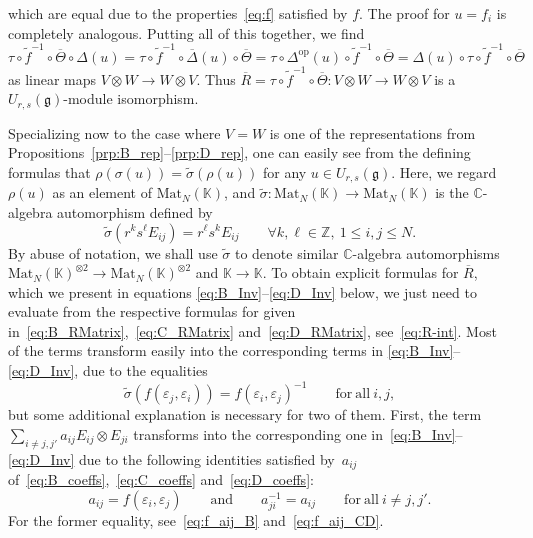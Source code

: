 \documentclass[pdftex]{sigma}
\numberwithin{equation}{section}
\DeclareMathOperator{\op}{op}
\newcommand{\fg}{\mathfrak{g}}
\newcommand{\BZ}{\mathbb{Z}}
\newcommand{\BC}{\mathbb{C}}
\newcommand{\uu}{U_{r,s}(\fg)}
\begin{document}
which are equal due to the properties~\eqref{eq:f} satisfied by $f$. The proof for $u = f_{i}$ is completely analogous. Putting all of this together, we find
\begin{displaymath}
 \tau \circ \widetilde{f}^{-1} \circ \overline{\Theta} \circ \Delta(u) =
 \tau \circ \widetilde{f}^{-1} \circ \overline{\Delta}(u)\circ \overline{\Theta} =
 \tau \circ \Delta^{\op}(u) \circ \widetilde{f}^{-1}\circ \overline{\Theta} =
 \Delta(u) \circ \tau \circ \widetilde{f}^{-1} \circ \overline{\Theta}
\end{displaymath}
as linear maps $V \otimes W \to W \otimes V$. Thus $\overline{R} = \tau \circ \widetilde{f}^{-1}\circ \overline{\Theta}\colon V \otimes W \to W \otimes V$ is a $\uu$-module isomorphism.

Specializing now to the case where $V = W$ is one of the representations from Propositions~\ref{prp:B_rep}--\ref{prp:D_rep}, one can easily see from the defining formulas that $\rho(\sigma(u)) = \widetilde{\sigma}(\rho(u))$ for any $u \in \uu$. Here, we regard $\rho(u)$ as an element of $\mathrm{Mat}_{N}(\mathbb{K})$, and $\widetilde{\sigma}\colon \mathrm{Mat}_{N}(\mathbb{K}) \to \mathrm{Mat}_{N}(\mathbb{K})$ is the $\mathbb{C}$-algebra automorphism defined by
\begin{displaymath}
 \widetilde{\sigma}(r^{k}s^{\ell}E_{ij}) = r^{\ell}s^{k}E_{ij} \qquad \forall k,\ell\in \BZ,\ 1\leq i,j\leq N.
\end{displaymath}
By abuse of notation, we shall use $\widetilde{\sigma}$ to denote similar $\BC$-algebra automorphisms $\mathrm{Mat}_{N}(\mathbb{K})^{\otimes 2} \to \mathrm{Mat}_{N}(\mathbb{K})^{\otimes 2}$ and $\mathbb{K}\to \mathbb{K}$. To obtain explicit formulas for $\overline{R}$, which we present in equations \eqref{eq:B_Inv}--\eqref{eq:D_Inv} below, we just need to evaluate  from the respective formulas for  given in~\eqref{eq:B_RMatrix},~\eqref{eq:C_RMatrix} and~\eqref{eq:D_RMatrix}, see~\eqref{eq:R-int}. Most of the terms transform easily into the corresponding terms in \eqref{eq:B_Inv}--\eqref{eq:D_Inv}, due to the equalities
\begin{displaymath}
 \widetilde{\sigma}(f(\varepsilon_j,\varepsilon_i))=f(\varepsilon_i,\varepsilon_j)^{-1}
 \qquad \mathrm{for\ all} \ i,j,
\end{displaymath}
but some additional explanation is necessary for two of them. First, the term $\sum_{i \neq j,j'} a_{ij}E_{ij} \otimes E_{ji}$ transforms into the corresponding one in~\eqref{eq:B_Inv}--\eqref{eq:D_Inv} due to the following identities satisfied by~$a_{ij}$ of~\eqref{eq:B_coeffs},~\eqref{eq:C_coeffs} and~\eqref{eq:D_coeffs}:
\begin{displaymath}
 a_{ij} = f(\varepsilon_{i},\varepsilon_{j}) \qquad \mathrm{and} \qquad a_{ji}^{-1} = a_{ij}
 \qquad \mathrm{for\ all} \ i \neq j,j'.
\end{displaymath}
For the former equality, see~\eqref{eq:f_aij_B} and~\eqref{eq:f_aij_CD}.
\end{document}
